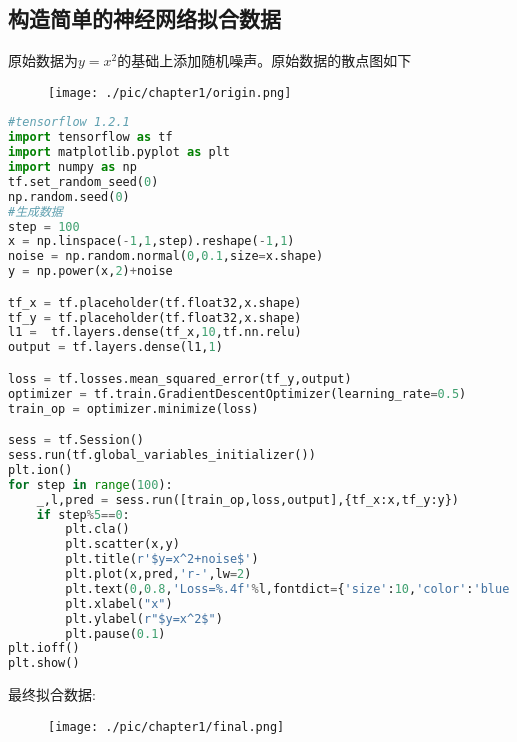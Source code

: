 \subsection{构造简单的神经网络拟合数据}
原始数据为$y=x^2$的基础上添加随机噪声。原始数据的散点图如下
\begin{center}
\begin{figure}[H]
\texttt{[image: ./pic/chapter1/origin.png]}
\end{figure}
\end{center}
\begin{lstlisting}[language=Python]
#tensorflow 1.2.1
import tensorflow as tf
import matplotlib.pyplot as plt
import numpy as np
tf.set_random_seed(0)
np.random.seed(0)
#生成数据
step = 100
x = np.linspace(-1,1,step).reshape(-1,1)
noise = np.random.normal(0,0.1,size=x.shape)
y = np.power(x,2)+noise

tf_x = tf.placeholder(tf.float32,x.shape)
tf_y = tf.placeholder(tf.float32,x.shape)
l1 =  tf.layers.dense(tf_x,10,tf.nn.relu)
output = tf.layers.dense(l1,1)

loss = tf.losses.mean_squared_error(tf_y,output)
optimizer = tf.train.GradientDescentOptimizer(learning_rate=0.5)
train_op = optimizer.minimize(loss)

sess = tf.Session()
sess.run(tf.global_variables_initializer())
plt.ion()
for step in range(100):
    _,l,pred = sess.run([train_op,loss,output],{tf_x:x,tf_y:y})
    if step%5==0:
        plt.cla()
        plt.scatter(x,y)
        plt.title(r'$y=x^2+noise$')
        plt.plot(x,pred,'r-',lw=2)
        plt.text(0,0.8,'Loss=%.4f'%l,fontdict={'size':10,'color':'blue'})
        plt.xlabel("x")
        plt.ylabel(r"$y=x^2$")
        plt.pause(0.1)
plt.ioff()
plt.show()
\end{lstlisting}
最终拟合数据:
\begin{figure}[H]
\texttt{[image: ./pic/chapter1/final.png]}
\end{figure}
